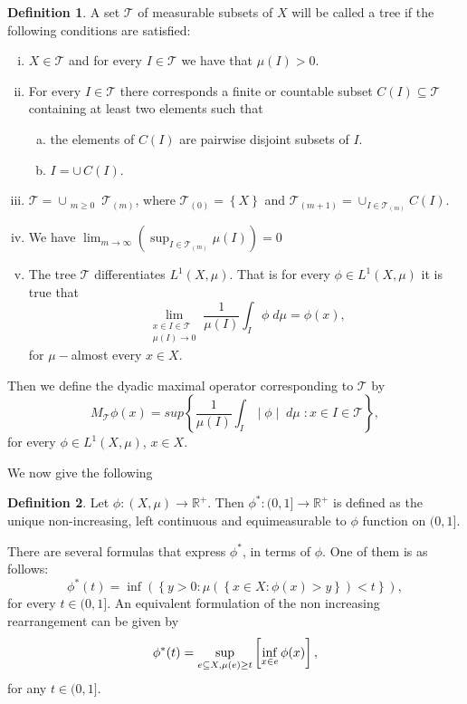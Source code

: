 \documentclass{article}
\numberwithin{equation}{section}
\theoremstyle{definition}
\newtheorem{definition}{Definition}[section]
\theoremstyle{remark}
\newcommand{\mc}[1]{\mathcal{#1}}
\begin{document}
\begin{definition} \label{def:2p1}
A set $\mc T$ of measurable subsets of $X$ will be called a tree if the following conditions are satisfied:
\begin{enumerate}[i)]
\item $X\in\mc T$ and for every $I\in\mc T$ we have that $\mu(I) > 0$.
\item For every $I\in\mc T$ there corresponds a finite or countable subset $C(I) \subseteq \mc T$ containing at least two elements such that
\vspace{-5pt}
\begin{enumerate}[a)]
\item the elements of $C(I)$ are pairwise disjoint subsets of $I$.
\item $I = \cup\, C(I)$.
\end{enumerate}
\item $\mc T = \cup_{\substack{ m\geq 0}} \mc T_{(m)}$, where $\mc T_{(0)} = \left\{ X \right\}$ and $\mc T_{(m+1)} = \cup_{I\in \mc T_{(m)}} C(I)$.
\item We have $\lim_{m\to\infty} \left( \sup_{I\in \mc T_{(m)}} \mu(I) \right)= 0 $
\item The tree $\mc T$ differentiates $L^1(X,\mu)$. That is for every $\phi \in L^1(X,\mu)$ it is true that \[ \lim_{\substack{x\in I \in \mc T \\ \mu (I)\to 0}} \frac{1}{\mu (I)}\int_I \phi \; d\mu = \phi(x),\] for $\mu-$almost every $x\in X$.
\end{enumerate}
\end{definition}


Then we define the dyadic maximal operator corresponding to $\mc T$ by
\begin{equation}\label{eq:2p1}
M_{\mc T}\phi (x)=sup \left\lbrace \frac{1}{\mu(I)} \int_I \mid \phi \mid \; d\mu \; : x\in I\in \mc T  \right\rbrace,
\end{equation}
for every $\phi \in L^1(X,\mu)$, $x\in X$.

We now give the following

\begin{definition}
Let $\phi: (X,\mu)\longrightarrow \mathbb{R}^{+}$. Then $\phi^{*}:(0,1]\longrightarrow \mathbb{R}^{+}$ is defined as the unique non-increasing, left continuous and equimeasurable to $\phi$ function on $(0,1]$.
\end{definition}

There are several formulas that express $\phi^{*}$, in terms of $\phi$.
One of them is as follows:
\[
\phi^{*}(t)=\inf \left( \left\lbrace y>0: \mu \left( \left\lbrace x\in X: \phi(x)>y\right\rbrace\right)<t \right\rbrace \right),
\]
for every $t\in (0,1]$. An equivalent formulation of the non increasing rearrangement can be given by
\[
\phi^{*}(t)=\sup_{e\subseteq X, \\  \mu(e)\geq t} \left[ \inf_{x\in e} \phi (x) \right],
\]
for any $t\in (0,1]$.
\end{document}
